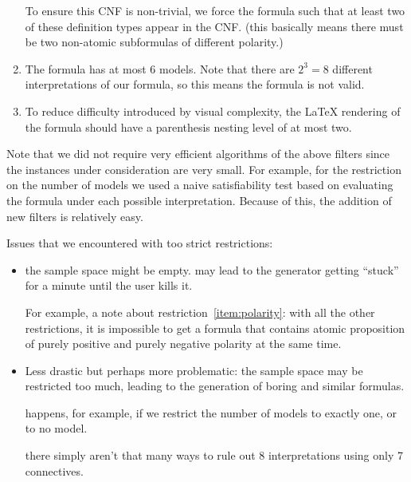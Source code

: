 \begin{enumerate}
        To ensure this CNF is non-trivial,
        we force the formula such that at least two of these definition types appear in the CNF.
        (this basically means there must be two non-atomic subformulas of different polarity.)
    \item
        The formula has at most $6$ models.
        Note that there are $2^3 = 8$ different interpretations of our formula,
        so this means the formula is not valid.
    \item
        To reduce difficulty introduced by visual complexity,
        the \LaTeX{} rendering of the formula should have a parenthesis nesting level of at most two.
\end{enumerate}

Note that we
did not require very efficient algorithms of the above filters since
the instances under consideration are very small.
For example, for the restriction on the number of models we used a naive satisfiability test
based on evaluating the formula under each possible interpretation.
Because of this, the addition of new filters is relatively easy.

Issues that we encountered with too strict restrictions:
\begin{itemize}
    \item
        the sample space might be empty.
        may lead to the generator getting ``stuck'' for a minute until the user kills it.

        For example, a note about restriction~\ref{item:polarity}:
        with all the other restrictions,
        it is impossible to get a formula that contains atomic proposition
        of purely positive and purely negative polarity at the same time.

    \item
        Less drastic but perhaps more problematic:
        the sample space may be restricted too much,
        leading to the generation of boring and similar formulas.

        happens, for example, if we restrict the number of models to exactly one,
        or to no model.

        there simply aren't that many ways to rule out 8 interpretations
        using only 7 connectives.
\end{itemize}

